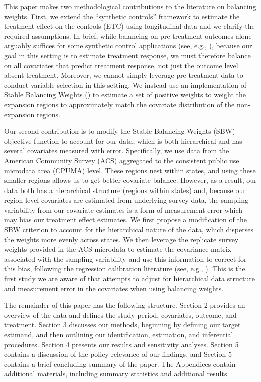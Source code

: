 \documentclass[aoas]{imsart}
\theoremstyle{plain}
\theoremstyle{remark}
\begin{document}
This paper makes two methodological contributions to the literature on balancing weights. First, we extend the ``synthetic controls'' framework to estimate the treatment effect on the controls (ETC) using longitudinal data and we clarify the required assumptions. In brief, while balancing on pre-treatment outcomes alone arguably suffices for some synthetic control applications (see, e.g., \cite{botosaru2017role}), because our goal in this setting is to estimate treatment response, we must therefore balance on all covariates that predict treatment response, not just the outcome level absent treatment. Moreover, we cannot simply leverage pre-treatment data to conduct variable selection in this setting. We instead use an implementation of Stable Balancing Weights (\cite{zubizarreta2015stable}) to estimate a set of positive weights to weight the expansion regions to approximately match the covariate distribution of the non-expansion regions. 

Our second contribution is to modify the Stable Balancing Weights (SBW) objective function to account for our data, which is both hierarchical and has several covariates measured with error. Specifically, we use data from the American Community Survey (ACS) aggregated to the consistent public use microdata area (CPUMA) level. These regions nest within states, and using these smaller regions allows us to get better covariate balance. However, as a result, our data both has a hierarchical structure (regions within states) and, because our region-level covariates are estimated from underlying survey data, the sampling variability from our covariate estimates is a form of measurement error which may bias our treatment effect estimates. We first propose a modification of the SBW criterion to account for the hierarchical nature of the data, which disperses the weights more evenly across states. We then leverage the replicate survey weights provided in the ACS microdata to estimate the covariance matrix associated with the sampling variability and use this information to correct for this bias, following the regression calibration literature (see, e.g., \cite{gleser1992importance}). This is the first study we are aware of that attempts to adjust for hierarchical data structure and measurement error in the covariates when using balancing weights. 

The remainder of this paper has the following structure. Section 2 provides an overview of the data and defines the study period, covariates, outcome, and treatment. Section 3 discusses our methods, beginning by defining our target estimand, and then outlining our identification, estimation, and inferential procedures. Section 4 presents our results and sensitivity analyses. Section 5 contains a discussion of the policy relevance of our findings, and Section 5 contains a brief concluding summary of the paper. The Appendices contain additional materials, including summary statistics and additional results.
\end{document}
